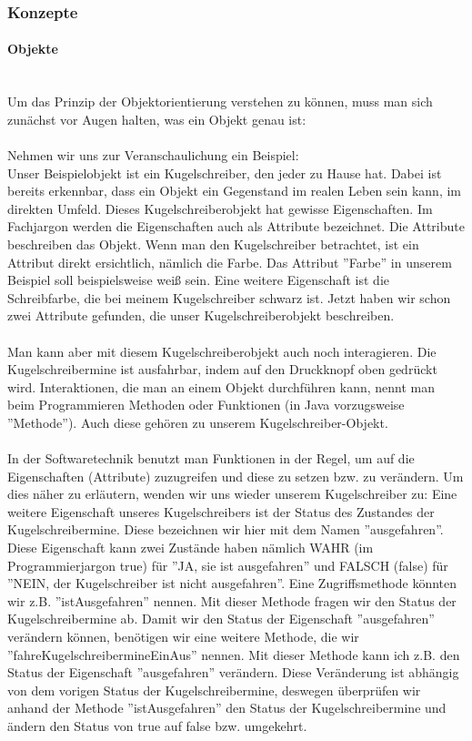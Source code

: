 \subsubsection{Konzepte}

\paragraph{Objekte}\ \\
Um das Prinzip der Objektorientierung verstehen zu können, muss man sich zunächst vor Augen halten, was ein Objekt genau ist:\\
\\
Nehmen wir uns zur Veranschaulichung ein Beispiel:\\
Unser Beispielobjekt ist ein Kugelschreiber, den jeder zu Hause hat. Dabei ist bereits erkennbar, dass ein Objekt ein Gegenstand im realen Leben sein kann, im direkten Umfeld. Dieses Kugelschreiberobjekt hat gewisse Eigenschaften. Im Fachjargon werden die Eigenschaften auch als Attribute bezeichnet. Die Attribute beschreiben das Objekt. Wenn man den Kugelschreiber betrachtet, ist ein Attribut direkt ersichtlich, nämlich die Farbe. Das Attribut ''Farbe'' in unserem Beispiel soll beispielsweise weiß sein. Eine weitere Eigenschaft ist die Schreibfarbe, die bei meinem Kugelschreiber schwarz ist. Jetzt haben wir schon zwei Attribute gefunden, die unser Kugelschreiberobjekt beschreiben.\\
\\
Man kann aber mit diesem Kugelschreiberobjekt auch noch interagieren. Die Kugelschreibermine ist ausfahrbar, indem auf den Druckknopf oben gedrückt wird. Interaktionen, die man an einem Objekt durchführen kann, nennt man beim Programmieren Methoden oder Funktionen (in Java vorzugsweise ''Methode''). Auch diese gehören zu unserem Kugelschreiber-Objekt.\\
\\
In der Softwaretechnik benutzt man Funktionen in der Regel, um auf die Eigenschaften (Attribute) zuzugreifen und  diese zu setzen bzw. zu verändern. Um dies näher zu erläutern, wenden wir uns wieder unserem Kugelschreiber zu: Eine weitere Eigenschaft unseres Kugelschreibers ist der Status des Zustandes der Kugelschreibermine. Diese bezeichnen wir hier mit dem Namen ''ausgefahren''. Diese Eigenschaft kann zwei Zustände haben nämlich WAHR (im Programmierjargon true) für ''JA, sie ist ausgefahren'' und FALSCH (false) für ''NEIN, der Kugelschreiber ist nicht ausgefahren''. Eine Zugriffsmethode könnten wir z.B. ''istAusgefahren'' nennen. Mit dieser Methode fragen wir den Status der Kugelschreibermine ab. Damit wir den Status der Eigenschaft ''ausgefahren'' verändern können, benötigen wir eine weitere Methode, die wir ''fahreKugelschreibermineEinAus'' nennen. Mit dieser Methode kann ich z.B. den Status der Eigenschaft ''ausgefahren'' verändern. Diese Veränderung ist abhängig von dem vorigen Status der Kugelschreibermine, deswegen überprüfen wir anhand der Methode ''istAusgefahren'' den Status der Kugelschreibermine und ändern den Status von true auf false bzw. umgekehrt.\\
